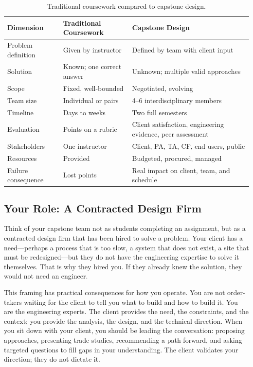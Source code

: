 \begin{table}[htbp]
\centering\small
\caption{Traditional coursework compared to capstone design.}\label{tab:coursework-vs-capstone}
\begin{tabularx}{\textwidth}{lXX}
\toprule
\textbf{Dimension} & \textbf{Traditional Coursework} & \textbf{Capstone Design} \\
\midrule
Problem definition & Given by instructor & Defined by team with client input \\
Solution & Known; one correct answer & Unknown; multiple valid approaches \\
Scope & Fixed, well-bounded & Negotiated, evolving \\
Team size & Individual or pairs & 4--6 interdisciplinary members \\
Timeline & Days to weeks & Two full semesters \\
Evaluation & Points on a rubric & Client satisfaction, engineering evidence, peer assessment \\
Stakeholders & One instructor & Client, PA, TA, CF, end users, public \\
Resources & Provided & Budgeted, procured, managed \\
Failure consequence & Lost points & Real impact on client, team, and schedule \\
\bottomrule
\end{tabularx}
\end{table}


\subsection{Your Role: A Contracted Design Firm}
Think of your capstone team not as students completing an assignment, but as a contracted design firm that has been hired to solve a problem. Your client has a need---perhaps a process that is too slow, a system that does not exist, a site that must be redesigned---but they do not have the engineering expertise to solve it themselves. That is why they hired you. If they already knew the solution, they would not need an engineer.

This framing has practical consequences for how you operate. You are not order-takers waiting for the client to tell you what to build and how to build it. You are the engineering experts. The client provides the need, the constraints, and the context; you provide the analysis, the design, and the technical direction. When you sit down with your client, you should be leading the conversation: proposing approaches, presenting trade studies, recommending a path forward, and asking targeted questions to fill gaps in your understanding. The client validates your direction; they do not dictate it.

